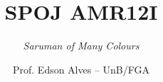 \title{SPOJ AMR12I}
\subtitle{\textit{Saruman of Many Colours}}
\author{Prof. Edson Alves -- UnB/FGA}
\date{}
